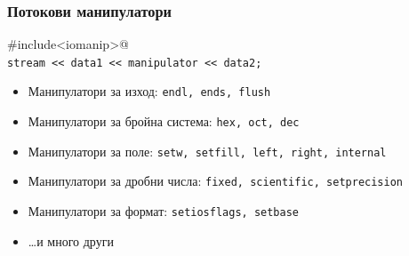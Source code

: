 \documentclass{beamer}
\begin{document}
\begin{frame}[fragile]
  \frametitle{Потокови манипулатори}

  \verb@#include<iomanip>@\\
  \verb#stream << data1 << manipulator << data2;#

  \begin{itemize}
  \item Манипулатори за изход: \tt{endl}, \tt{ends}, \tt{flush}
  \item Манипулатори за бройна система: \tt{hex}, \tt{oct}, \tt{dec}
  \item Манипулатори за поле: \tt{setw}, \tt{setfill}, \tt{left}, \tt{right}, \tt{internal}
  \item Манипулатори за дробни числа: \tt{fixed}, \tt{scientific}, \tt{setprecision}
  \item Манипулатори за формат: \tt{setiosflags}, \tt{setbase}
  \item \ldots и много други
  \end{itemize}
\end{frame}
\end{document}
